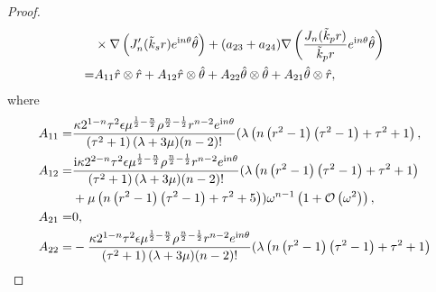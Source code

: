 \documentclass[11pt,reqno,twoside]{amsart}
\theoremstyle{definition}
\theoremstyle{remark}
\numberwithin{equation}{section}
\begin{document}
\begin{proof}
\begin{align}
				&\times\nabla \left(J_{n}' (\tilde{k}_{s}  r ) e^{\mathrm{i}n\theta } \hat{\theta}\right)+(a_{23}+a_{24})\nabla \left ( \frac{J_{n} (\tilde{k}_{p}  r )}{\tilde{k}_{p}r }e^{\mathrm{i}n\theta } \hat{\theta}  \right )\notag\\
				=&A_{11}\hat{r}\otimes \hat{r} +A_{12}\hat{r}\otimes \hat{\theta }+A_{22}\hat{\theta }\otimes \hat{\theta }+A_{21}\hat{\theta }\otimes \hat{r },\label{eq:grau}
			\end{align}
			where
			\begin{align}
				A_{11}=&\frac{\kappa 2^{1-n} \tau ^2 \epsilon  \mu ^{\frac{1}{2}-\frac{n}{2}} \rho ^{\frac{n}{2}-\frac{1}{2}} r^{n-2} e^{\mathrm{i}n \theta  } }{\left(\tau ^2+1\right) (\lambda +3 \mu )  (n-2)!}(\lambda  \left(n \left(r^2-1\right) \left(\tau ^2-1\right)+\tau ^2+1\right),\notag\\
				A_{12}=&\frac{\mathrm{i} \kappa 2^{2-n} \tau ^2 \epsilon  \mu ^{\frac{1}{2}-\frac{n}{2}} \rho ^{\frac{n}{2}-\frac{1}{2}} r^{n-2} e^{\mathrm{i} n\theta  } }{\left(\tau ^2+1\right) (\lambda +3 \mu )  (n-2)!}(\lambda  \left(n \left(r^2-1\right) \left(\tau ^2-1\right)+\tau ^2+1\right)\notag\\
				&+\mu  \left(n \left(r^2-1\right) \left(\tau ^2-1\right)+\tau ^2+5\right))\omega^{n-1}\left(1+\mathcal{O}\left(\omega^2\right)\right),\notag\\
				A_{21}=&0,\notag\\
				A_{22}=&-\frac{\kappa 2^{1-n} \tau ^2 \epsilon  \mu ^{\frac{1}{2}-\frac{n}{2}} \rho ^{\frac{n}{2}-\frac{1}{2}} r^{n-2} e^{\mathrm{i}n \theta  } }{\left(\tau ^2+1\right) (\lambda +3 \mu )  (n-2)!}(\lambda  \left(n \left(r^2-1\right) \left(\tau ^2-1\right)+\tau ^2+1\right)\notag\\

\end{align}
\end{proof}
\end{document}
